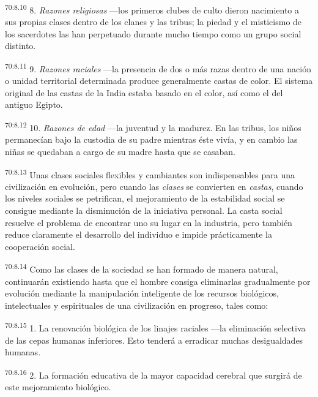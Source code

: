 \documentclass[twoside, 11pt]{book}
\begin{document}
\par
\textsuperscript{70:8.10} 8. \textit{Razones religiosas} ---los primeros clubes de culto dieron nacimiento a sus propias clases dentro de los clanes y las tribus; la piedad y el misticismo de los sacerdotes las han perpetuado durante mucho tiempo como un grupo social distinto.

\par
\textsuperscript{70:8.11} 9. \textit{Razones raciales} ---la presencia de dos o más razas dentro de una nación o unidad territorial determinada produce generalmente castas de color. El sistema original de las castas de la India estaba basado en el color, así como el del antiguo Egipto.

\par
\textsuperscript{70:8.12} 10. \textit{Razones de edad} ---la juventud y la madurez. En las tribus, los niños permanecían bajo la custodia de su padre mientras éste vivía, y en cambio las niñas se quedaban a cargo de su madre hasta que se casaban.

\par
\textsuperscript{70:8.13} Unas clases sociales flexibles y cambiantes son indispensables para una civilización en evolución, pero cuando las \textit{clases} se convierten en \textit{castas}, cuando los niveles sociales se petrifican, el mejoramiento de la estabilidad social se consigue mediante la disminución de la iniciativa personal. La casta social resuelve el problema de encontrar uno su lugar en la industria, pero también reduce claramente el desarrollo del individuo e impide prácticamente la cooperación social.

\par
\textsuperscript{70:8.14} Como las clases de la sociedad se han formado de manera natural, continuarán existiendo hasta que el hombre consiga eliminarlas gradualmente por evolución mediante la manipulación inteligente de los recursos biológicos, intelectuales y espirituales de una civilización en progreso, tales como:

\par
\textsuperscript{70:8.15} 1. La renovación biológica de los linajes raciales ---la eliminación selectiva de las cepas humanas inferiores. Esto tenderá a erradicar muchas desigualdades humanas.

\par
\textsuperscript{70:8.16} 2. La formación educativa de la mayor capacidad cerebral que surgirá de este mejoramiento biológico.
\end{document}
